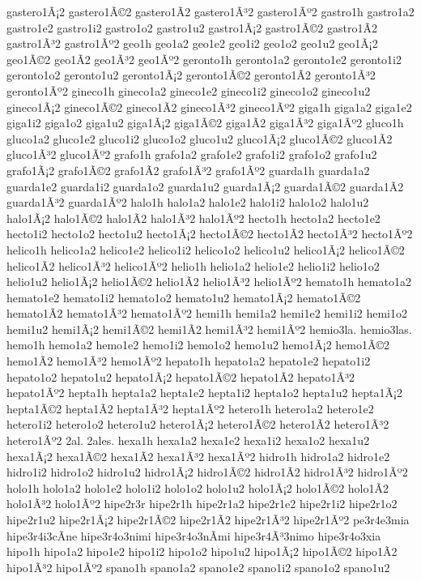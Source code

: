 {gastero1Ã¡2 gastero1Ã©2 gastero1Ã­2 gastero1Ã³2 gastero1Ãº2
gastro1h
gastro1a2 gastro1e2 gastro1i2 gastro1o2 gastro1u2
gastro1Ã¡2 gastro1Ã©2 gastro1Ã­2 gastro1Ã³2 gastro1Ãº2
geo1h
geo1a2 geo1e2 geo1i2 geo1o2 geo1u2
geo1Ã¡2 geo1Ã©2 geo1Ã­2 geo1Ã³2 geo1Ãº2
geronto1h
geronto1a2 geronto1e2 geronto1i2 geronto1o2 geronto1u2
geronto1Ã¡2 geronto1Ã©2 geronto1Ã­2 geronto1Ã³2 geronto1Ãº2
gineco1h
gineco1a2 gineco1e2 gineco1i2 gineco1o2 gineco1u2
gineco1Ã¡2 gineco1Ã©2 gineco1Ã­2 gineco1Ã³2 gineco1Ãº2
giga1h
giga1a2 giga1e2 giga1i2 giga1o2 giga1u2
giga1Ã¡2 giga1Ã©2 giga1Ã­2 giga1Ã³2 giga1Ãº2
gluco1h
gluco1a2 gluco1e2 gluco1i2 gluco1o2 gluco1u2
gluco1Ã¡2 gluco1Ã©2 gluco1Ã­2 gluco1Ã³2 gluco1Ãº2
grafo1h
grafo1a2 grafo1e2 grafo1i2 grafo1o2 grafo1u2
grafo1Ã¡2 grafo1Ã©2 grafo1Ã­2 grafo1Ã³2 grafo1Ãº2
guarda1h
guarda1a2 guarda1e2 guarda1i2 guarda1o2 guarda1u2
guarda1Ã¡2 guarda1Ã©2 guarda1Ã­2 guarda1Ã³2 guarda1Ãº2
halo1h
halo1a2 halo1e2 halo1i2 halo1o2 halo1u2
halo1Ã¡2 halo1Ã©2 halo1Ã­2 halo1Ã³2 halo1Ãº2
hecto1h
hecto1a2 hecto1e2 hecto1i2 hecto1o2 hecto1u2
hecto1Ã¡2 hecto1Ã©2 hecto1Ã­2 hecto1Ã³2 hecto1Ãº2
helico1h
helico1a2 helico1e2 helico1i2 helico1o2 helico1u2
helico1Ã¡2 helico1Ã©2 helico1Ã­2 helico1Ã³2 helico1Ãº2
helio1h
helio1a2 helio1e2 helio1i2 helio1o2 helio1u2
helio1Ã¡2 helio1Ã©2 helio1Ã­2 helio1Ã³2 helio1Ãº2
hemato1h
hemato1a2 hemato1e2 hemato1i2 hemato1o2 hemato1u2
hemato1Ã¡2 hemato1Ã©2 hemato1Ã­2 hemato1Ã³2 hemato1Ãº2
hemi1h
hemi1a2 hemi1e2 hemi1i2 hemi1o2 hemi1u2
hemi1Ã¡2 hemi1Ã©2 hemi1Ã­2 hemi1Ã³2 hemi1Ãº2
hemio3la.
hemio3las.
hemo1h
hemo1a2 hemo1e2 hemo1i2 hemo1o2 hemo1u2
hemo1Ã¡2 hemo1Ã©2 hemo1Ã­2 hemo1Ã³2 hemo1Ãº2
hepato1h
hepato1a2 hepato1e2 hepato1i2 hepato1o2 hepato1u2
hepato1Ã¡2 hepato1Ã©2 hepato1Ã­2 hepato1Ã³2 hepato1Ãº2
hepta1h
hepta1a2 hepta1e2 hepta1i2 hepta1o2 hepta1u2
hepta1Ã¡2 hepta1Ã©2 hepta1Ã­2 hepta1Ã³2 hepta1Ãº2
hetero1h
hetero1a2 hetero1e2 hetero1i2 hetero1o2 hetero1u2
hetero1Ã¡2 hetero1Ã©2 hetero1Ã­2 hetero1Ã³2 hetero1Ãº2
2al.
2ales.
hexa1h
hexa1a2 hexa1e2 hexa1i2 hexa1o2 hexa1u2
hexa1Ã¡2 hexa1Ã©2 hexa1Ã­2 hexa1Ã³2 hexa1Ãº2
hidro1h
hidro1a2 hidro1e2 hidro1i2 hidro1o2 hidro1u2
hidro1Ã¡2 hidro1Ã©2 hidro1Ã­2 hidro1Ã³2 hidro1Ãº2
holo1h
holo1a2 holo1e2 holo1i2 holo1o2 holo1u2
holo1Ã¡2 holo1Ã©2 holo1Ã­2 holo1Ã³2 holo1Ãº2
hipe2r3r
hipe2r1h
hipe2r1a2 hipe2r1e2 hipe2r1i2 hipe2r1o2 hipe2r1u2
hipe2r1Ã¡2 hipe2r1Ã©2 hipe2r1Ã­2 hipe2r1Ã³2 hipe2r1Ãº2
pe3r4e3mia
hipe3r4i3cÃ­ne
hipe3r4o3nimi
hipe3r4o3nÃ­mi
hipe3r4Ã³3nimo
hipe3r4o3xia
hipo1h
hipo1a2 hipo1e2 hipo1i2 hipo1o2 hipo1u2
hipo1Ã¡2 hipo1Ã©2 hipo1Ã­2 hipo1Ã³2 hipo1Ãº2
spano1h
spano1a2 spano1e2 spano1i2 spano1o2 spano1u2
}
